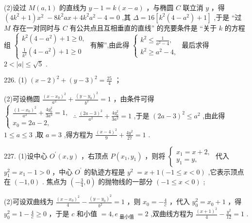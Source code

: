 \documentclass[10pt]{article}
\begin{document}
(2)设过 \(M\left( {a,1}\right)\) 的直线为 \(y - 1 = k\left( {x - a}\right)\) ，与椭圆 \(C\) 联立消 \(y\) ，得 \(\left( {4{k}^{2} + 1}\right) {x}^{2} \; - 8{k}^{2}{ax} + 4{k}^{2}{a}^{2} - 4 = 0\) ,其 \(\Delta  = {16}\left\lbrack  {{k}^{2}\left( {4 - {a}^{2}}\right)  + 1}\right\rbrack\) ,于是 “过 \(M\) 存在一对同时与 \(C\) 有公共点且互相垂直的直线” 的充要条件是 “关于 \(k\) 的方程组 \(\left\{  \begin{array}{l} {k}^{2}\left( {4 - {a}^{2}}\right)  + 1 \geq  0, \\  \frac{1}{{k}^{2}}\left( {4 - {a}^{2}}\right)  + 1 \geq  0 \end{array}\right.\) 有解”,由此得 \(\left\{  \begin{array}{l} {k}^{2} \leq  \frac{1}{{a}^{2} - 4}, \\  {k}^{2} \geq  {a}^{2} - 4, \end{array}\right.\) 最后求得 \(2 < \left| a\right|  \leq  \sqrt{5}\) .

226. (1) \({\left( x - 2\right) }^{2} + {\left( y - 3\right) }^{2} = \frac{25}{4}\) ；

(2)可设椭圆 \(\frac{{\left( x - {x}_{0}\right) }^{2}}{{a}^{2}} + \frac{{\left( y - {y}_{0}\right) }^{2}}{{b}^{2}} = 1\) ，由条件可得 \(\left\{  {\begin{array}{l} \frac{{\left( 1 - {x}_{0}\right) }^{2}}{{a}^{2}} + \frac{4{y}_{0}^{2}}{3{a}^{2}} = 1, \\  {x}_{0} = {2a} - 2, \end{array}\;\therefore \;\frac{{\left( 2a - 3\right) }^{2}}{{a}^{2}} + \frac{4{y}_{0}^{2}}{3{a}^{2}} = 1}\right.\) ,于是 \({\left( 2a - 3\right) }^{2} \leq  {a}^{2}\) ,由此得 \(1 \leq  a \leq  3\) ,取 \(a = 3\) ,得方程为 \(\frac{{\left( x - 4\right) }^{2}}{9} + \frac{4{y}^{2}}{27} = 1\) .

227. (1)设中心 \({O}^{\prime }\left( {x,y}\right)\) ，右顶点 \(P\left( {{x}_{1},{y}_{1}}\right)\) ，则将 \(\left\{  \begin{array}{l} {x}_{1} = x + 2, \\  {y}_{1} = y, \end{array}\right.\) 代入 \({y}_{1}^{2} = {x}_{1} - 1 > 0\) ，中心 \({O}^{\prime }\) 的轨迹方程是 \({y}^{2} \; = x + 1\left( {-1 \leq  x < 0}\right)\) ,它表示顶点在 \(\left( {-1,0}\right)\) . 焦点为 \(\left( {-\frac{3}{4},0}\right)\) 的抛物线的一部分 \(\left( {-1 \leq  x < 0}\right)\) ;

(2)可设双曲线为 \(\frac{{\left( x - {x}_{0}\right) }^{2}}{4} - \frac{{\left( y - {y}_{0}\right) }^{2}}{{b}^{2}} = 1\) ，则 \({x}_{0} =  - \frac{4}{c}\) ，代入 \({y}_{0}^{2} = {x}_{0} + 1\) ，得 \({y}_{0}^{2} = 1 - \frac{4}{c} \geq  0\) ，于是 \(c\) 和小值 \(= 4,{e}_{\text{ 最小值 }} = 2\) ,双曲线方程为 \(\frac{{\left( x + 1\right) }^{2}}{4} - \frac{{y}^{2}}{12} = 1\) .
\end{document}
